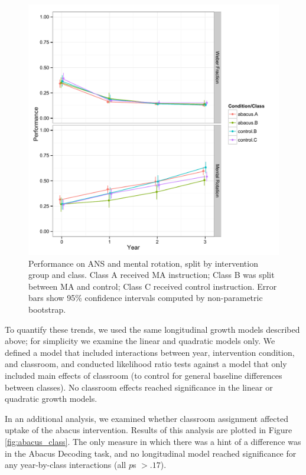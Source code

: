 \documentclass[11pt]{article}
\begin{document}
\begin{figure}[H]
\begin{center}
\includegraphics[width=5.5in]{figures/cog2_class.pdf}
\end{center}
\caption{Performance on ANS and mental rotation, split by intervention group and class. Class A received MA instruction; Class B was split between MA and control; Class C received control instruction. Error bars show 95\% confidence intervals computed by non-parametric bootstrap.}
\label{fig:cogclass2}
\end{figure}

To quantify these trends, we used the same longitudinal growth models described above; for simplicity we examine the linear and quadratic models only. We defined a model that included interactions between year, intervention condition, and classroom, and conducted likelihood ratio tests against a model that only included main effects of classroom (to control for general baseline differences between classes). No classroom effects reached significance in the linear or quadratic growth models.

In an additional analysis, we examined whether classroom assignment affected uptake of the abacus intervention. Results of this analysis are plotted in Figure \ref{fig:abacus_class}. The only measure in which there was a hint of a difference was in the Abacus Decoding task, and no longitudinal model reached significance for any year-by-class interactions (all $p$s $> .17$).
\end{document}
